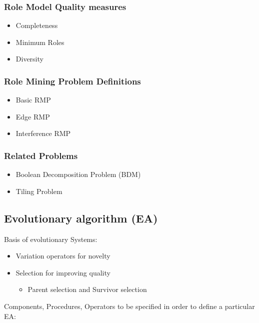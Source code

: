     \subsubsection{Role Model Quality measures}
        \begin{itemize}
            \item Completeness
            \item Minimum Roles
            \item Diversity
        \end{itemize}
        
    \subsubsection{Role Mining Problem Definitions}
        \begin{itemize}
            \item Basic RMP
            \item Edge RMP
            \item Interference RMP
        \end{itemize}
        
    \subsubsection{Related Problems}
        \begin{itemize}
            \item Boolean Decomposition Problem (BDM)
            \item Tiling Problem
        \end{itemize}
    
    \subsection{Evolutionary algorithm (EA)}
    Basis of evolutionary Systems:\cite{Eiben}
    \begin{itemize}
        \item Variation operators for novelty
        \item Selection for improving quality
        \begin{itemize}
            \item Parent selection and Survivor selection
        \end{itemize}
    \end{itemize}
    Components, Procedures, Operators to be specified in order to define a particular EA:\cite{Eiben}
    

